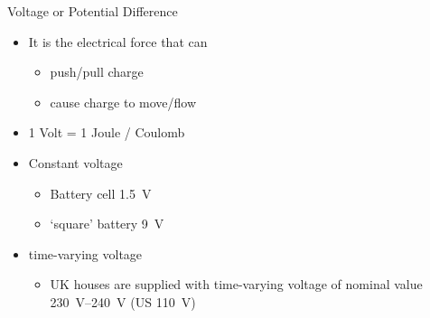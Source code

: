 \documentclass[svgnames,x11names]{beamer}
\begin{document}
\begin{frame}{Voltage or Potential Difference}
  \begin{itemize}
  \item It is the \alert{electrical force} that can
    \begin{itemize}
    \item push/pull charge
    \item cause charge to move/flow
    \end{itemize}
  \item 1 Volt = 1 Joule / Coulomb
  \item Constant voltage
    \begin{itemize}
    \item  Battery cell \SI{1.5}{\volt}
    \item `square' battery \SI{9}{\volt}
    \end{itemize}
  \item  time-varying voltage
    \begin{itemize}
    \item UK houses are supplied with time-varying voltage of
      nominal value \SIrange{230}{240}{V} (US \SI{110}{V})
    \end{itemize}
  \end{itemize}
\end{frame}
\end{document}
